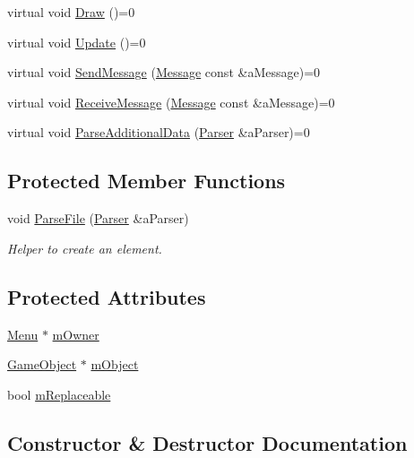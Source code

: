 \begin{DoxyCompactItemize}
virtual void \hyperlink{classMenuElement_a64a401777d1f8f9bb668d4b134bb13f7}{Draw} ()=0
\item 
virtual void \hyperlink{classMenuElement_a025aeb7bf41cf9ca7069dba7dbf07f47}{Update} ()=0
\item 
virtual void \hyperlink{classMenuElement_a1b341775acf0ec3d3a064dccd78af2cd}{Send\+Message} (\hyperlink{classMessage}{Message} const \&a\+Message)=0
\item 
virtual void \hyperlink{classMenuElement_a9efc98212994476526bc0b314e18b950}{Receive\+Message} (\hyperlink{classMessage}{Message} const \&a\+Message)=0
\item 
virtual void \hyperlink{classMenuElement_abd61bb2ffffd877dd39a0079512a8dbc}{Parse\+Additional\+Data} (\hyperlink{classParser}{Parser} \&a\+Parser)=0
\end{DoxyCompactItemize}
\subsection*{Protected Member Functions}
\begin{DoxyCompactItemize}
\item 
void \hyperlink{classMenuElement_a594ed711907de7ee09943a702a74aac9}{Parse\+File} (\hyperlink{classParser}{Parser} \&a\+Parser)
\begin{DoxyCompactList}\small\item\em Helper to create an element. \end{DoxyCompactList}\end{DoxyCompactItemize}
\subsection*{Protected Attributes}
\begin{DoxyCompactItemize}
\item 
\hyperlink{classMenu}{Menu} $\ast$ \hyperlink{classMenuElement_aceef1dcd8e34c8ec8738a566e1bc3c3f}{m\+Owner}
\item 
\hyperlink{classGameObject}{Game\+Object} $\ast$ \hyperlink{classMenuElement_af1999a2fe9a63ebc78cd513b66cc8249}{m\+Object}
\item 
bool \hyperlink{classMenuElement_aa7757133db57bcc40c04d80278aa6b43}{m\+Replaceable}
\end{DoxyCompactItemize}


\subsection{Constructor \& Destructor Documentation}
